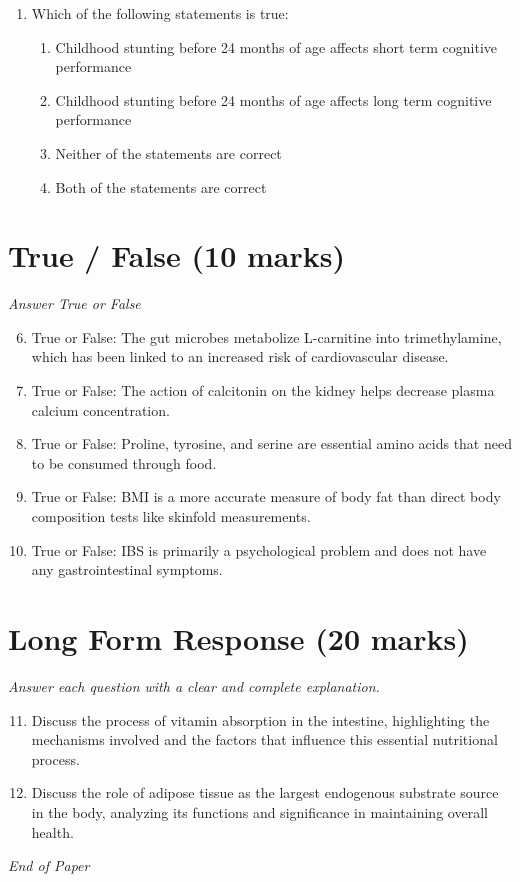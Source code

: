 \documentclass[12pt]{article}
\begin{document}
\begin{enumerate}[label=\arabic*.]
\begin{enumerate}[label=(\alph*)]
    \item Parietal cells secrete pepsinogen, the inactive precursor of pepsin
    \item G Cells secrete hydrochloric acid
\end{enumerate}
\item Which of the following statements is true:
\begin{enumerate}[label=(\alph*)]
    \item Childhood stunting before 24 months of age affects short term cognitive performance
    \item Childhood stunting before 24 months of age affects long term cognitive performance
    \item Neither of the statements are correct
    \item Both of the statements are correct
\end{enumerate}
\end{enumerate}

\section*{True / False (10 marks)}
\textit{Answer True or False}
\begin{enumerate}[label=\arabic*.]
\setcounter{enumi}{5}
\item True or False: The gut microbes metabolize L-carnitine into trimethylamine, which has been linked to an increased risk of cardiovascular disease.
\item True or False: The action of calcitonin on the kidney helps decrease plasma calcium concentration.
\item True or False: Proline, tyrosine, and serine are essential amino acids that need to be consumed through food.
\item True or False: BMI is a more accurate measure of body fat than direct body composition tests like skinfold measurements.
\item True or False: IBS is primarily a psychological problem and does not have any gastrointestinal symptoms.
\end{enumerate}

\section*{Long Form Response (20 marks)}
\textit{Answer each question with a clear and complete explanation.}
\begin{enumerate}[label=\arabic*.]
\setcounter{enumi}{10}
\item Discuss the process of vitamin absorption in the intestine, highlighting the mechanisms involved and the factors that influence this essential nutritional process.
\item Discuss the role of adipose tissue as the largest endogenous substrate source in the body, analyzing its functions and significance in maintaining overall health.
\end{enumerate}

\vfill
\noindent\textit{End of Paper}
\end{document}
